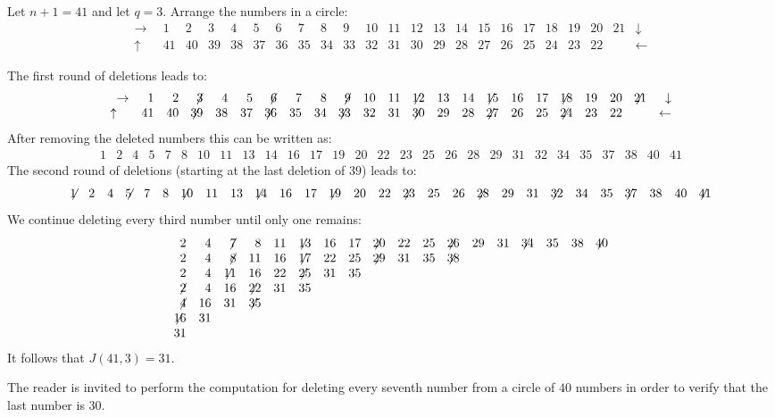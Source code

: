 \begin{example}
Let $n+1=41$ and let $q=3$. Arrange the numbers in a circle:
\[
\begin{array}{rrrrrrrrrrrrrrrrrrrrrrr}
\rightarrow&1&2&3&4&5&6&7&8&9&10&
           11&12&13&14&15&16&17&18&19&20&21&
\downarrow\\
\uparrow\quad&41&40&39&38&37&36&35&34&33&
32&31&30&29&28&27&26&25&24&23&22&
&\leftarrow
\end{array}
\]

\newpage

The first round of deletions leads to:
\[
\begin{array}{rrrrrrrrrrrrrrrrrrrrrrr}
\rightarrow&1&2&\not\! 3&4&5&\not\! 6&7&8&\not\! 9&10&
           11&\not\!\! 12&13&14&\not\!\! 15&16&17&\not\!\! 18&19&20&\not\!\! 21&
\downarrow\\
	\uparrow\quad&41&40&\not\!\! 39&38&37&\not\!\! 36&35&34&\not\!\! 33&
32&31&\not\!\! 30&29&28&\not\!\! 27&26&25&\not\!\! 24&23&22&
&\leftarrow
\end{array}
\]
After removing the deleted numbers this can be written as:
\[
\begin{array}{rrrrrrrrrrrrrrrrrrrrrrrrrrrr}
1&2&4&5&7&8&10&11&13&14&16&17&19&20&
22&23&25&26&28&29&31&32&34&35&37&38&40&41
\end{array}
\]
The second round of deletions (starting at the last deletion of $39$) leads to:
\[
\begin{array}{rrrrrrrrrrrrrrrrrrrrrrrrrrrr}
\not\!\! 1&2&4&\not\!\! 5&7&8&\not\!\! 10&11&13&\not\!\! 14&16&17&\not\!\! 19&20&
22&\not\!\! 23&25&26&\not\!\! 28&29&31&\not\!\! 32&34&35&\not\!\! 37&38&40&\not\!\! 41
\end{array}
\]
We continue deleting every third number until only one remains:
\[
\begin{array}{rrrrrrrrrrrrrrrrrr}
2&4&\not\!7&8&11&\not\!\!13&16&17&\not\!\!20&22&25&\not\!\!26&29&31&\not\!\!34&35&38&\not\!\!40
\\
2&4&\not\!8&11&16&\not\!\!17&22&25&\not\!\!29&31&35&\not\!\!38
\\
2&4&\not\!\!11&16&22&\not\!\!25&31&35
\\
\not\!2&4&16&\not\!\!22&31&35
\\
\not\!4&16&31&\not\!\!35
\\
\not\!\!16&31
\\
31
\end{array}
\]
It follows that $J(41,3)=31$.
\end{example}

The reader is invited to perform the computation for deleting every seventh number from a circle of $40$ numbers in order to  verify that the last number is $30$.

